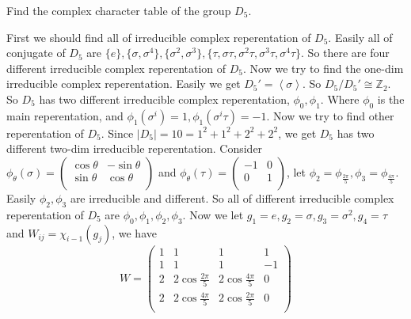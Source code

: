\documentclass{ctexart}
\begin{document}
\begin{problem}
Find the complex character table of the group \(D_5\).
\end{problem}

\begin{solution}
	First we should find all of irreducible complex reperentation of \(D_5\).
	Easily all of conjugate of \(D_5\) are \(\{ e\},\{ \sigma,\sigma^4\}, \{ \sigma^2,\sigma^3\},\{ \tau,\sigma \tau,\sigma^2 \tau,\sigma^3 \tau,\sigma^4 \tau\}\).
	So there are four different irreducible complex reperentation of \(D_5\).
	Now we try to find the one-dim irreducible complex reperentation. Easily we get \(D_5' = \left\langle  \sigma\right\rangle \).
	So \(D_5 / D_5' \cong \mathbb{Z}_2\). So \(D_5\) has two different irreducible complex reperentation, \(\phi_0,\phi_1\).
	Where \(\phi_0\) is the main reperentation, and \(\phi_1( \sigma^i )=1,\phi_1( \sigma^i \tau)=-1\).
	Now we try to find other reperentation of \(D_5\). Since \(| D_5|=10=1^2+1^2+2^2+2^2\), we get \(D_5\) has two different two-dim irreducible reperentation.
	Consider \(\phi_\theta( \sigma)=\begin{pmatrix}
		\cos \theta & -\sin \theta \\
		\sin \theta & \cos \theta  \\
	\end{pmatrix}\) and \(\phi_\theta( \tau)=\begin{pmatrix}
		-1 & 0 \\
		0  & 1 \\
	\end{pmatrix}\), let \(\phi_2=\phi_{\frac{2 \pi}{5}},\phi_3=\phi_{\frac{4 \pi}{5}}\). Easily \(\phi_2,\phi_3\) are irreducible and different.
	So all of different irreducible complex reperentation of \(D_5\) are \(\phi_0,\phi_1,\phi_2,\phi_3\).
	Now we let \(g_1=e,g_2=\sigma,g_3=\sigma^2,g_4=\tau\) and \(W_{ij}=\chi_{i-1}( g_j)\), we have
	\[
		W=\begin{pmatrix}
		  1 & 1                      & 1                      & 1  \\
			1 & 1                      & 1                      & -1 \\
			2 & 2\cos \frac{2 \pi}{5}  & 2 \cos \frac{4 \pi}{5} & 0  \\
			2 & 2 \cos \frac{4 \pi}{5} & 2\cos \frac{2 \pi}{5}  & 0  \\
		\end{pmatrix}
	\]
\end{solution}
\end{document}

